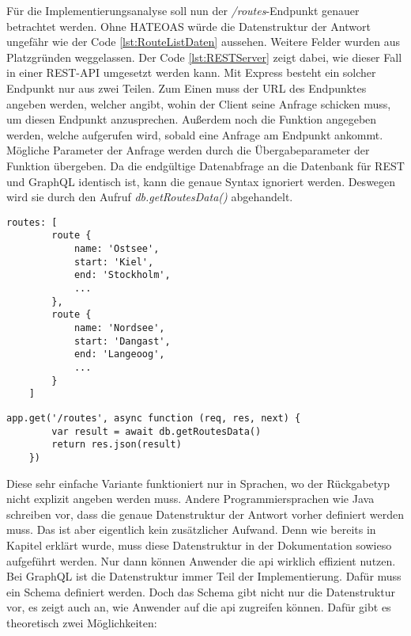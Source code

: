 Für die Implementierungsanalyse soll nun der \textit{/routes}-Endpunkt genauer betrachtet werden. Ohne \ac{HATEOAS} würde die Datenstruktur der Antwort ungefähr wie der Code \ref{lst:RouteListDaten} aussehen. Weitere Felder wurden aus Platzgründen weggelassen. Der Code \ref{lst:RESTServer} zeigt dabei, wie dieser Fall in einer REST-API umgesetzt werden kann. Mit Express besteht ein solcher Endpunkt nur aus zwei Teilen. Zum Einen muss der \ac{URL} des Endpunktes angeben werden, welcher angibt, wohin der Client seine Anfrage schicken muss, um diesen Endpunkt anzusprechen. Außerdem noch die Funktion angegeben werden, welche aufgerufen wird, sobald eine Anfrage am Endpunkt ankommt. Mögliche Parameter der Anfrage werden durch die Übergabeparameter der Funktion übergeben. Da die endgültige Datenabfrage an die Datenbank für \ac{REST} und GraphQL identisch ist, kann die genaue Syntax ignoriert werden. Deswegen wird sie durch den Aufruf \textit{db.getRoutesData()} abgehandelt.

\begin{lstlisting}[caption={Beispiel Datenstruktur für eine Liste von Routen},captionpos=b,label=lst:RouteListDaten] 
	routes: [
		route {
			name: 'Ostsee',
			start: 'Kiel',
			end: 'Stockholm',
			...
		},
		route {
			name: 'Nordsee',
			start: 'Dangast',
			end: 'Langeoog',
			...
		}
	]
\end{lstlisting}

\begin{lstlisting}[caption={REST Server Implementierung},captionpos=b,label=lst:RESTServer] 
	app.get('/routes', async function (req, res, next) {
		var result = await db.getRoutesData()
		return res.json(result)
	})
\end{lstlisting}

Diese sehr einfache Variante funktioniert nur in Sprachen, wo der Rückgabetyp nicht explizit angeben werden muss. Andere Programmiersprachen wie Java schreiben vor, dass die genaue Datenstruktur der Antwort vorher definiert werden muss. Das ist aber eigentlich kein zusätzlicher Aufwand. Denn wie bereits in Kapitel  erklärt wurde, muss diese Datenstruktur in der Dokumentation sowieso aufgeführt werden.  Nur dann können Anwender die \ac{api} wirklich effizient nutzen.\\
Bei GraphQL ist die Datenstruktur immer Teil der Implementierung. Dafür muss ein Schema definiert werden. Doch das Schema gibt nicht nur die Datenstruktur vor, es zeigt auch an, wie Anwender auf die \ac{api} zugreifen können. Dafür gibt es theoretisch zwei Möglichkeiten: 

